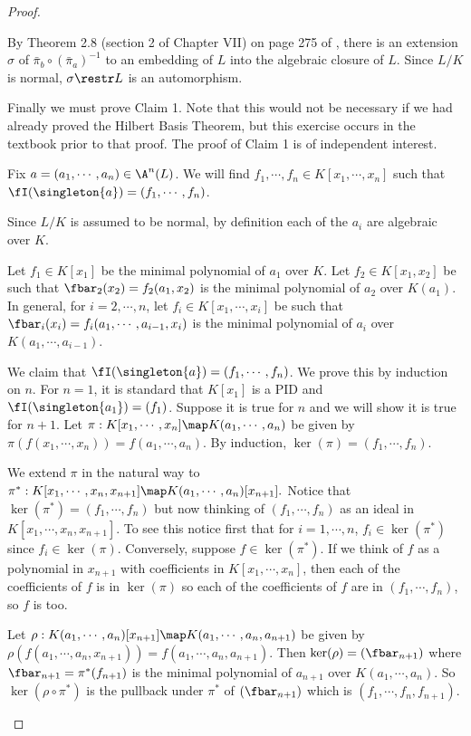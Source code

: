 \documentclass[oneside,12pt]{amsart}
\begin{document}
\begin{proof}
\begin{subproof}
By Theorem 2.8 (section 2 of Chapter VII) on page 275 of \cite{Lang_Book}, there is an extension $\sigma$
of $\bar{\pi}_b\circ (\bar{\pi}_a)^{-1}$ to an embedding of $L$ into the algebraic closure of $L$. Since
$L/K$ is normal, $\sigma\restr L$ is an automorphism.
\end{subproof}

Finally we must prove Claim 1. Note that this would not be necessary if we had already proved the Hilbert Basis Theorem, but this exercise occurs in the textbook prior to that proof. The proof of Claim 1 is of independent interest.

\begin{subproof}
Fix $a=(a_1,\cdots,a_n)\in\A^n(L)$. We will find $f_1,\cdots,f_n\in K[x_1,\cdots,x_n]$ such that
$\fI(\singleton{a}) = (f_1,\cdots,f_n)$.

Since $L/K$ is assumed to be normal, by definition each of the $a_i$ are algebraic over $K$. 


Let $f_1 \in K[x_1]$ be the minimal polynomial of $a_1$ over $K$. Let $f_2\in K[x_1,x_2]$ be such that
$\fbar_2(x_2)=f_2(a_1,x_2)$ is the minimal polynomial of $a_2$ over $K(a_1)$. In general, for $i=2,\cdots,n$,
let $f_i\in K[x_1,\cdots, x_i]$ be such that $\fbar_i(x_i)=f_i(a_1,\cdots,a_{i-1},x_i)$ is the minimal polynomial of $a_i$
over $K(a_1,\cdots,a_{i-1})$. 

We claim that $\fI(\singleton{a}) = (f_1,\cdots,f_n)$. We prove this by induction on $n$. For $n=1$, it is
standard that $K[x_1]$ is a PID and $\fI(\singleton{a_1}) = (f_1)$.
Suppose it is true for $n$ and we will show it is true for $n+1$.
Let $\pi:K[x_1,\cdots,x_n]\map K(a_1,\cdots, a_n)$ be given by $\pi(f(x_1,\cdots,x_n)) = f(a_1,\cdots,a_n)$.
By induction, $\ker(\pi) = (f_1,\cdots,f_n)$. 

We extend $\pi$ in the natural way to 
$\pi^*:K[x_1,\cdots,x_n,x_{n+1}]\map K(a_1,\cdots, a_n)[x_{n+1}].$ Notice that  $\ker(\pi^*) = (f_1,\cdots,f_n)$ but now thinking of $(f_1,\cdots,f_n)$ as an
ideal in $K[x_1,\cdots,x_n,x_{n+1}]$. To see this notice first that for $i=1,\cdots,n$,
 $f_i\in\ker(\pi^*)$ since $f_i\in\ker(\pi)$. Conversely, suppose $f\in\ker(\pi^*)$.
If we think of $f$ as a polynomial in $x_{n+1}$
with coefficients in $K[x_1,\cdots,x_n]$, then each of the coefficients of $f$ is
in $\ker(\pi)$ so each of the coefficients of $f$ are in $(f_1,\cdots,f_n)$, so $f$ is too.


Let $\rho : K(a_1,\cdots,a_n)[x_{n+1}] \map K(a_1,\cdots,a_n,a_{n+1})$ be given by 
$\rho(f(a_1,\cdots,a_n,x_{n+1})) = f(a_1,\cdots,a_n,a_{n+1})$. Then
$\ker(\rho) = (\fbar_{n+1})$ where $\fbar_{n+1}=\pi^*(f_{n+1})$ is the minimal polynomial
of $a_{n+1}$ over $K(a_1,\cdots,a_n)$. So $\ker(\rho\circ\pi^*)$ is the pullback
under $\pi^*$ of $(\fbar_{n+1})$ which is $(f_1,\cdots,f_n,f_{n+1})$.
\end{subproof}



\end{proof}





\end{document}
